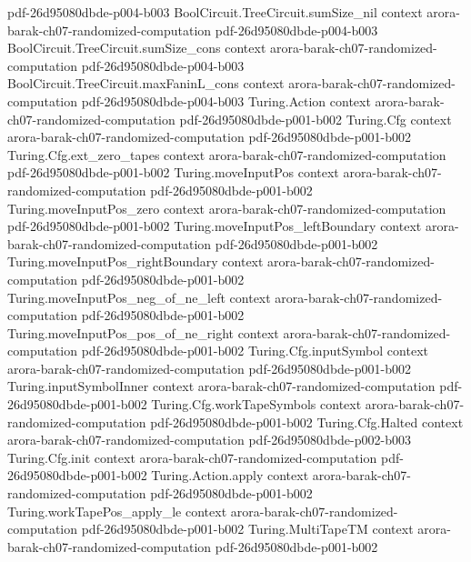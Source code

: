\begin{theorem}
  {pdf-26d95080dbde-p004-b003}
\proofstep
  {BoolCircuit.TreeCircuit.sumSize_nil}
  {context}
  {arora-barak-ch07-randomized-computation}
  {pdf-26d95080dbde-p004-b003}
\proofstep
  {BoolCircuit.TreeCircuit.sumSize_cons}
  {context}
  {arora-barak-ch07-randomized-computation}
  {pdf-26d95080dbde-p004-b003}
\proofstep
  {BoolCircuit.TreeCircuit.maxFaninL_cons}
  {context}
  {arora-barak-ch07-randomized-computation}
  {pdf-26d95080dbde-p004-b003}
\proofstep
  {Turing.Action}
  {context}
  {arora-barak-ch07-randomized-computation}
  {pdf-26d95080dbde-p001-b002}
\proofstep
  {Turing.Cfg}
  {context}
  {arora-barak-ch07-randomized-computation}
  {pdf-26d95080dbde-p001-b002}
\proofstep
  {Turing.Cfg.ext_zero_tapes}
  {context}
  {arora-barak-ch07-randomized-computation}
  {pdf-26d95080dbde-p001-b002}
\proofstep
  {Turing.moveInputPos}
  {context}
  {arora-barak-ch07-randomized-computation}
  {pdf-26d95080dbde-p001-b002}
\proofstep
  {Turing.moveInputPos_zero}
  {context}
  {arora-barak-ch07-randomized-computation}
  {pdf-26d95080dbde-p001-b002}
\proofstep
  {Turing.moveInputPos_leftBoundary}
  {context}
  {arora-barak-ch07-randomized-computation}
  {pdf-26d95080dbde-p001-b002}
\proofstep
  {Turing.moveInputPos_rightBoundary}
  {context}
  {arora-barak-ch07-randomized-computation}
  {pdf-26d95080dbde-p001-b002}
\proofstep
  {Turing.moveInputPos_neg_of_ne_left}
  {context}
  {arora-barak-ch07-randomized-computation}
  {pdf-26d95080dbde-p001-b002}
\proofstep
  {Turing.moveInputPos_pos_of_ne_right}
  {context}
  {arora-barak-ch07-randomized-computation}
  {pdf-26d95080dbde-p001-b002}
\proofstep
  {Turing.Cfg.inputSymbol}
  {context}
  {arora-barak-ch07-randomized-computation}
  {pdf-26d95080dbde-p001-b002}
\proofstep
  {Turing.inputSymbolInner}
  {context}
  {arora-barak-ch07-randomized-computation}
  {pdf-26d95080dbde-p001-b002}
\proofstep
  {Turing.Cfg.workTapeSymbols}
  {context}
  {arora-barak-ch07-randomized-computation}
  {pdf-26d95080dbde-p001-b002}
\proofstep
  {Turing.Cfg.Halted}
  {context}
  {arora-barak-ch07-randomized-computation}
  {pdf-26d95080dbde-p002-b003}
\proofstep
  {Turing.Cfg.init}
  {context}
  {arora-barak-ch07-randomized-computation}
  {pdf-26d95080dbde-p001-b002}
\proofstep
  {Turing.Action.apply}
  {context}
  {arora-barak-ch07-randomized-computation}
  {pdf-26d95080dbde-p001-b002}
\proofstep
  {Turing.workTapePos_apply_le}
  {context}
  {arora-barak-ch07-randomized-computation}
  {pdf-26d95080dbde-p001-b002}
\proofstep
  {Turing.MultiTapeTM}
  {context}
  {arora-barak-ch07-randomized-computation}
  {pdf-26d95080dbde-p001-b002}
\proofstep

\end{theorem}
